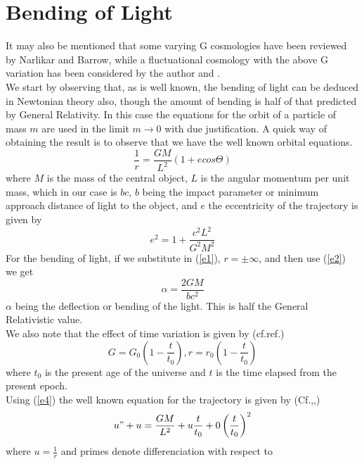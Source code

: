\section{Bending of Light}
It may also be mentioned that some varying G cosmologies have been reviewed
by Narlikar and Barrow, while a fluctuational cosmology with the above G
variation has been considered by the author \cite{r3,r4,r5,r6} and
\cite{r7}.\\
We start by observing that, as is well known, the bending of light
can be deduced in Newtonian theory also, though the amount of bending is half
of that predicted by General Relativity\cite{r8,r9,r10,r11}.
In this case the equations for the
orbit of a particle of mass $m$ are used in the limit $m \to 0$ with due
justification. A quick way
of obtaining the result is to observe that we have the well known orbital
equations\cite{r1,r12}.
\begin{equation}
\frac{1}{r} = \frac{GM}{L^2} (1+ecos\Theta)\label{e1}
\end{equation}
where $M$ is the mass of the central object, $L$ is the angular momentum per
unit mass, which in our case is $bc$, $b$ being the impact parameter or
minimum approach distance of light to the object, and $e$ the eccentricity
of the trajectory is given by
\begin{equation}
e^2 = 1+ \frac{c^2L^2}{G^2M^2}\label{e2}
\end{equation}
For the bending of light, if we substitute in (\ref{e1}), $r = \pm \infty$, and
then use (\ref{e2}) we get
\begin{equation}
\alpha = \frac{2GM}{bc^2}\label{e3}
\end{equation}
$\alpha$ being the deflection or bending of the light. This is half the General
Relativistic value.\\
We also note that the effect of time variation is given by (cf.ref.\cite{r1})
\begin{equation}
G = G_0 (1-\frac{t}{t_0}),r = r_0 (1-\frac{t}{t_0})\label{e4}
\end{equation}
where $t_0$ is the present age of the universe and $t$ is the time elapsed from
the present epoch.\\
Using (\ref{e4}) the well known equation for the trajectory is given by
(Cf.\cite{r13},\cite{r12},\cite{r14})
\begin{equation}
u" + u = \frac{GM}{L^2} + u\frac{t}{t_0} + 0 \left ( \frac{t}{t_0}\right )^2\label{e5}
\end{equation}
where $u = \frac{1}{r}$ and primes denote differenciation with respect to
